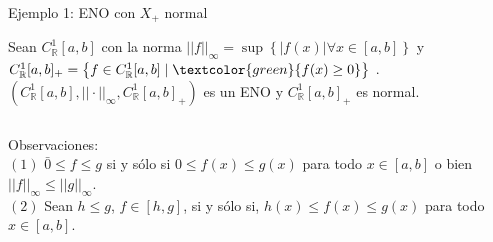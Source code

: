 


\begin{frame}{Ejemplo 1: ENO con $X_{+}$  normal}

\begin{block}{}
	Sean $C_{\mathbb{R}}^{1} [a,b] $ con   la norma  $  || f ||_{\infty} =  \sup \left\lbrace  \lvert f(x)  \rvert \forall x  \in \left[ a, b \right] \right\rbrace  $  y $C_{\mathbb{R}}^{1} [a,b]_{+} =\left\lbrace f \in C_{\mathbb{R}}^{1} [a,b] \mid \textcolor{green}{f(x) \geq 0} \right\rbrace  $ . $ ( C_{\mathbb{R}}^{1} [a,b], || \cdot ||_{\infty} , C_{\mathbb{R}}^{1} [a,b]_{+} ) $ es un ENO y $C_{\mathbb{R}}^{1} [a,b]_{+}$ es normal.
\end{block}
\begin{columns}


	Observaciones:\\
 $(1) $	$ \bar{0} \leq  f \leq g $	 si y sólo si $ 0 \leq  f(x) \leq g(x)$ para todo $x \in [a,b]$ o bien $ || f ||_{\infty} \leq || g ||_{\infty} $.\\
 
 $(2) $ Sean	$   h \leq g $, $f \in [h,g] $,  si y sólo si, $ h(x) \leq  f(x) \leq g(x)$ para todo $x \in [a,b]$.
 
	 


 
\end{columns} 
    

\end{frame}


